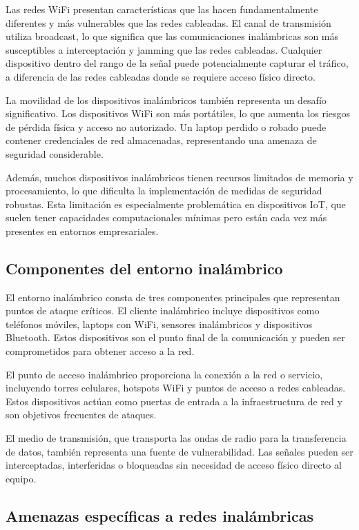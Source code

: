 Las redes WiFi presentan características que las hacen fundamentalmente diferentes y más vulnerables que las redes cableadas. El canal de transmisión utiliza broadcast, lo que significa que las comunicaciones inalámbricas son más susceptibles a interceptación y jamming que las redes cableadas. Cualquier dispositivo dentro del rango de la señal puede potencialmente capturar el tráfico, a diferencia de las redes cableadas donde se requiere acceso físico directo.

La movilidad de los dispositivos inalámbricos también representa un desafío significativo. Los dispositivos WiFi son más portátiles, lo que aumenta los riesgos de pérdida física y acceso no autorizado. Un laptop perdido o robado puede contener credenciales de red almacenadas, representando una amenaza de seguridad considerable.

Además, muchos dispositivos inalámbricos tienen recursos limitados de memoria y procesamiento, lo que dificulta la implementación de medidas de seguridad robustas. Esta limitación es especialmente problemática en dispositivos IoT, que suelen tener capacidades computacionales mínimas pero están cada vez más presentes en entornos empresariales.

\subsection{Componentes del entorno inalámbrico}

El entorno inalámbrico consta de tres componentes principales que representan puntos de ataque críticos. El cliente inalámbrico incluye dispositivos como teléfonos móviles, laptops con WiFi, sensores inalámbricos y dispositivos Bluetooth. Estos dispositivos son el punto final de la comunicación y pueden ser comprometidos para obtener acceso a la red.

El punto de acceso inalámbrico proporciona la conexión a la red o servicio, incluyendo torres celulares, hotspots WiFi y puntos de acceso a redes cableadas. Estos dispositivos actúan como puertas de entrada a la infraestructura de red y son objetivos frecuentes de ataques.

El medio de transmisión, que transporta las ondas de radio para la transferencia de datos, también representa una fuente de vulnerabilidad. Las señales pueden ser interceptadas, interferidas o bloqueadas sin necesidad de acceso físico directo al equipo.

\subsection{Amenazas específicas a redes inalámbricas}

